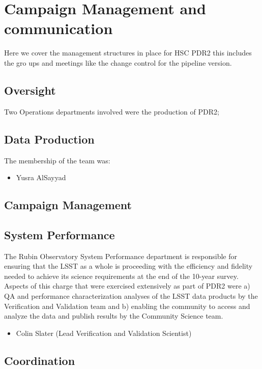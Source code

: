 \section{Campaign Management and communication} \label{sec:management}

Here we cover the management structures in place for HSC PDR2 this includes the gro
ups and meetings like the change control for the pipeline version.

\subsection{Oversight}
Two Operations departments involved were the production of PDR2; 

\subsection{Data Production}

The membership of the team was:
\begin{itemize}
\item Yusra AlSayyad
\end{itemize}


\subsection{Campaign Management}

\subsection{System Performance}
The Rubin Observatory System Performance department is responsible for ensuring that the LSST as a whole is proceeding with the efficiency and fidelity needed to achieve its science requirements at the end of the 10-year survey. 
Aspects of this charge that were exercised extensively as part of PDR2 were a) QA and performance characterization analyses of the LSST data products by the Verification and Validation team and b) enabling the community to access and analyze the data and publish results by the Community Science team.
\begin{itemize}

\item Colin Slater (Lead Verification and Validation Scientist)
\end{itemize}


\subsection{Coordination}

